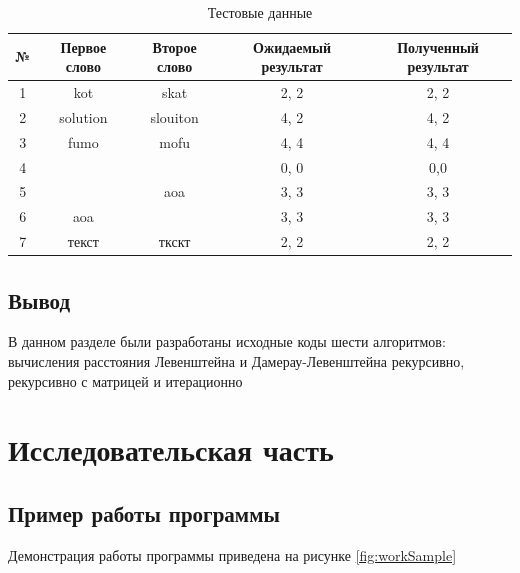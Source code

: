 \documentclass[12pt]{report}
\begin{document}
    \begin{table}[H]
        \centering
        \caption{Тестовые данные}
        \label{tab:tests}
        \begin{tabular}{|c c c c c|}
            \hline
            № & Первое слово & Второе слово & Ожидаемый результат & Полученный результат \\ [0.8ex]
            \hline
            1 & kot          & skat         & 2, 2                & 2, 2                 \\
            \hline
            2 & solution     & slouiton     & 4, 2                & 4, 2                 \\
            \hline
            3 & fumo         & mofu         & 4, 4                & 4, 4                 \\
            \hline
            4 &              &              & 0, 0                & 0,0                  \\
            \hline
            5 &              & aoa          & 3, 3                & 3, 3                 \\
            \hline
            6 & aoa          &              & 3, 3                & 3, 3                 \\
            \hline
            7 & текст        & ткскт        & 2, 2                & 2, 2                 \\
            \hline
        \end{tabular}
    \end{table}


    \section{Вывод}
    В данном разделе были разработаны исходные коды шести алгоритмов: вычисления расстояния
    Левенштейна и Дамерау-Левенштейна рекурсивно, рекурсивно с матрицей и итерационно


    \chapter{Исследовательская часть}


    \section{Пример работы программы}
    Демонстрация работы программы приведена на рисунке \ref{fig:workSample}
\end{document}
